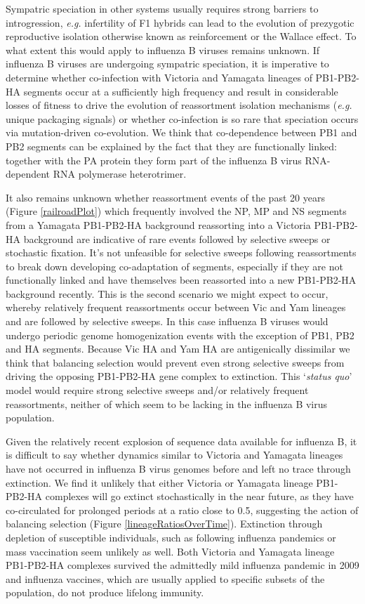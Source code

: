\documentclass[11pt,oneside,letterpaper]{article}
\begin{document}
Sympatric speciation in other systems usually requires strong barriers to introgression, \textit{e.g.} infertility of F1 hybrids can lead to the evolution of prezygotic reproductive isolation otherwise known as reinforcement or the Wallace effect.
To what extent this would apply to influenza B viruses remains unknown.
If influenza B viruses are undergoing sympatric speciation, it is imperative to determine whether co-infection with Victoria and Yamagata lineages of PB1-PB2-HA segments occur at a sufficiently high frequency and result in considerable losses of fitness to drive the evolution of reassortment isolation mechanisms (\textit{e.g.} unique packaging signals) or whether co-infection is so rare that speciation occurs via mutation-driven co-evolution.
We think that co-dependence between PB1 and PB2 segments can be explained by the fact that they are functionally linked: together with the PA protein they form part of the influenza B virus RNA-dependent RNA polymerase heterotrimer.

It also remains unknown whether reassortment events of the past 20 years (Figure \ref{railroadPlot}) which frequently involved the NP, MP and NS segments from a Yamagata PB1-PB2-HA background reassorting into a Victoria PB1-PB2-HA background are indicative of rare events followed by selective sweeps or stochastic fixation.
It's not unfeasible for selective sweeps following reassortments to break down developing co-adaptation of segments, especially if they are not functionally linked and have themselves been reassorted into a new PB1-PB2-HA background recently.
This is the second scenario we might expect to occur, whereby relatively frequent reassortments occur between Vic and Yam lineages and are followed by selective sweeps.
In this case influenza B viruses would undergo periodic genome homogenization events with the exception of PB1, PB2 and HA segments.
Because Vic HA and Yam HA are antigenically dissimilar we think that balancing selection would prevent even strong selective sweeps from driving the opposing PB1-PB2-HA gene complex to extinction.
This `\textit{status quo}' model would require strong selective sweeps and/or relatively frequent reassortments, neither of which seem to be lacking in the influenza B virus population.

Given the relatively recent explosion of sequence data available for influenza B, it is difficult to say whether dynamics similar to Victoria and Yamagata lineages have not occurred in influenza B virus genomes before and left no trace through extinction.
We find it unlikely that either Victoria or Yamagata lineage PB1-PB2-HA complexes will go extinct stochastically in the near future, as they have co-circulated for prolonged periods at a ratio close to 0.5, suggesting the action of balancing selection (Figure \ref{lineageRatiosOverTime}).
Extinction through depletion of susceptible individuals, such as following influenza pandemics or mass vaccination seem unlikely as well.
Both Victoria and Yamagata lineage PB1-PB2-HA complexes survived the admittedly mild influenza pandemic in 2009 and influenza vaccines, which are usually applied to specific subsets of the population, do not produce lifelong immunity.
\end{document}
